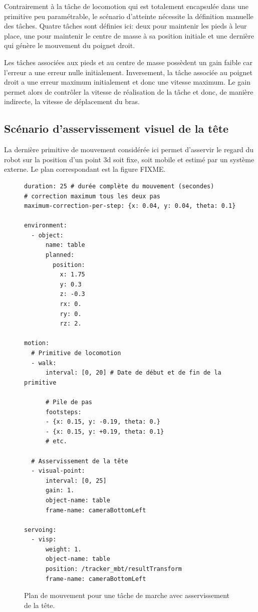 Contrairement à la tâche de locomotion qui est totalement encapsulée
dans une primitive peu paramétrable, le scénario d'atteinte nécessite
la définition manuelle des tâches. Quatre tâches sont définies ici:
deux pour maintenir les pieds à leur place, une pour maintenir le
centre de masse à sa position initiale et une dernière qui génère le
mouvement du poignet droit.

Les tâches associées aux pieds et au centre de masse possèdent un gain
faible car l'erreur a une erreur nulle initialement. Inversement, la
tâche associée au poignet droit a une erreur maximum initialement et
donc une vitesse maximum. Le gain permet alors de contrôler la vitesse
de réalisation de la tâche et donc, de manière indirecte, la vitesse
de déplacement du bras.

\FloatBarrier

\subsection{Scénario d'asservissement visuel de la tête}

La dernière primitive de mouvement considérée ici permet d'asservir le
regard du robot sur la position d'un point 3d soit fixe, soit mobile
et estimé par un système externe. Le plan correspondant est la figure FIXME.

\begin{figure}
  \footnotesize
  \begin{center}
\begin{verbatim}
duration: 25 # durée complète du mouvement (secondes)
# correction maximum tous les deux pas
maximum-correction-per-step: {x: 0.04, y: 0.04, theta: 0.1}

environment:
  - object:
      name: table
      planned:
        position:
          x: 1.75
          y: 0.3
          z: -0.3
          rx: 0.
          ry: 0.
          rz: 2.

motion:
  # Primitive de locomotion
  - walk:
      interval: [0, 20] # Date de début et de fin de la primitive

      # Pile de pas
      footsteps:
      - {x: 0.15, y: -0.19, theta: 0.}
      - {x: 0.15, y: +0.19, theta: 0.1}
      # etc.

  # Asservissement de la tête
  - visual-point:
      interval: [0, 25]
      gain: 1.
      object-name: table
      frame-name: cameraBottomLeft

servoing:
  - visp:
      weight: 1.
      object-name: table
      position: /tracker_mbt/resultTransform
      frame-name: cameraBottomLeft
\end{verbatim}
  \end{center}
  \caption{Plan de mouvement pour une tâche de marche avec asservissement de la tête.}
\end{figure}

